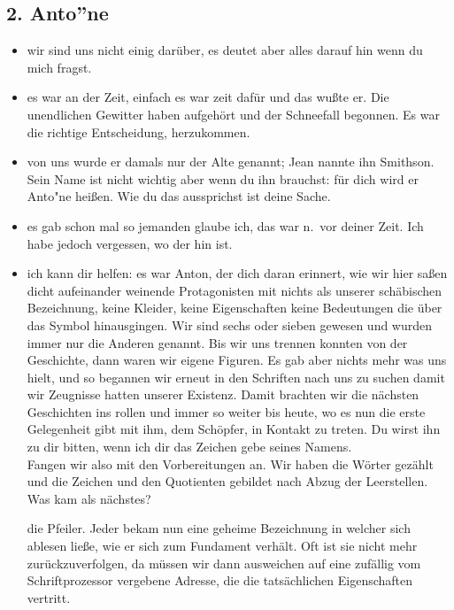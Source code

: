\documentclass[
]{article}
\author{}
\date{\vspace{-2.5em}}
\providecommand{\tightlist}{%
  \setlength{\itemsep}{0pt}\setlength{\parskip}{0pt}}
\begin{document}
\subsection{2. Anto''ne}\label{antone}

\begin{itemize}
\tightlist
\item
  wir sind uns nicht einig darüber, es deutet aber alles darauf hin wenn
  du mich fragst.\\
\item
  es war an der Zeit, einfach es war zeit dafür und das wußte er. Die
  unendlichen Gewitter haben aufgehört und der Schneefall begonnen. Es
  war die richtige Entscheidung, herzukommen.\\
\item
  von uns wurde er damals nur der Alte genannt; Jean nannte ihn
  Smithson. Sein Name ist nicht wichtig aber wenn du ihn brauchst: für
  dich wird er Anto"ne heißen. Wie du das aussprichst ist deine Sache.\\
\item
  es gab schon mal so jemanden glaube ich, das war n.~vor deiner Zeit.
  Ich habe jedoch vergessen, wo der hin ist.\\
\item
  ich kann dir helfen: es war Anton, der dich daran erinnert, wie wir
  hier saßen dicht aufeinander weinende Protagonisten mit nichts als
  unserer schäbischen Bezeichnung, keine Kleider, keine Eigenschaften
  keine Bedeutungen die über das Symbol hinausgingen. Wir sind sechs
  oder sieben gewesen und wurden immer nur die Anderen genannt. Bis wir
  uns trennen konnten von der Geschichte, dann waren wir eigene Figuren.
  Es gab aber nichts mehr was uns hielt, und so begannen wir erneut in
  den Schriften nach uns zu suchen damit wir Zeugnisse hatten unserer
  Existenz. Damit brachten wir die nächsten Geschichten ins rollen und
  immer so weiter bis heute, wo es nun die erste Gelegenheit gibt mit
  ihm, dem Schöpfer, in Kontakt zu treten. Du wirst ihn zu dir bitten,
  wenn ich dir das Zeichen gebe seines Namens.\\

  Fangen wir also mit den Vorbereitungen an. Wir haben die Wörter
  gezählt und die Zeichen und den Quotienten gebildet nach Abzug der
  Leerstellen. Was kam als nächstes?

  die Pfeiler. Jeder bekam nun eine geheime Bezeichnung in welcher sich
  ablesen ließe, wie er sich zum Fundament verhält. Oft ist sie nicht
  mehr zurückzuverfolgen, da müssen wir dann ausweichen auf eine
  zufällig vom Schriftprozessor vergebene Adresse, die die tatsächlichen
  Eigenschaften vertritt.


\end{itemize}
\end{document}
